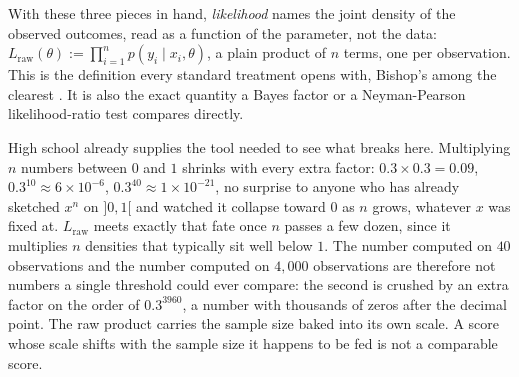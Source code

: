 \documentclass[11pt]{article}
\begin{document}
With these three pieces in hand, \emph{likelihood} names the joint
density of the observed outcomes, read as a function of the parameter,
not the data: $L_{\text{raw}}(\theta) := \prod_{i=1}^n p(y_i
\mid x_i, \theta)$, a plain product of $n$ terms, one per observation.
This is the definition every standard treatment opens with, Bishop's
among the clearest \citep{bishop2006prml}. It is also the exact
quantity a Bayes factor or a Neyman-Pearson likelihood-ratio test
compares directly.

High school already supplies the tool needed to see what breaks here.
Multiplying $n$ numbers between $0$ and $1$ shrinks with every extra
factor: $0.3 \times 0.3 = 0.09$, $0.3^{10} \approx 6 \times 10^{-6}$,
$0.3^{40} \approx 1 \times 10^{-21}$, no surprise to anyone who has
already sketched $x^n$ on $]0,1[$ and watched it collapse toward $0$ as
$n$ grows, whatever $x$ was fixed at. $L_{\text{raw}}$ meets exactly
that fate once $n$ passes a few dozen, since it multiplies $n$
densities that typically sit well below $1$. The number computed on
$40$ observations and the number computed on $4{,}000$ observations
are therefore not numbers a single threshold could ever compare: the
second is crushed by an extra factor on the order of $0.3^{3960}$, a
number with thousands of zeros after the decimal point. The raw
product carries the sample size baked into its own scale. A score
whose scale shifts with the sample size it happens to be fed is not a
comparable score.
\end{document}
